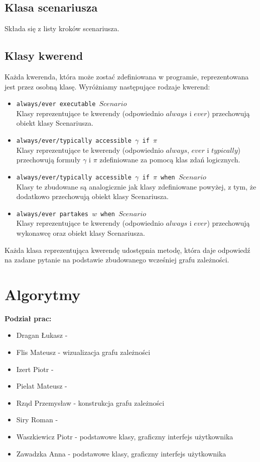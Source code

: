 \documentclass{article}
\begin{document}
\subsection{Klasa scenariusza}
Składa się z listy kroków scenariusza.

\subsection{Klasy kwerend}
Każda kwerenda, która może zostać zdefiniowana w programie, reprezentowana jest przez osobną klasę. Wyróżniamy następujące rodzaje kwerend:
\begin{itemize}
\item {\large\texttt{always/ever executable $Scenario$}} \\
Klasy reprezentujące te kwerendy (odpowiednio $always$ i $ever$) przechowują obiekt klasy Scenariusza.
\item {\large\texttt{always/ever/typically accessible $\gamma$ if $\pi$}}\\
Klasy reprezentujące te kwerendy (odpowiednio $always$, $ever$ i $typically$) przechowują formuły $\gamma$ i $\pi$ zdefiniowane za pomocą klas zdań logicznych.
\item {\large\texttt{always/ever/typically accessible $\gamma$ if $\pi$ when $Scenario$}}\\
Klasy te zbudowane są analogicznie jak klasy zdefiniowane powyżej, z tym, że dodatkowo przechowują obiekt klasy Scenariusza.
\item {\large\texttt{always/ever partakes $w$ when $Scenario$}}\\
Klasy reprezentujące te kwerendy (odpowiednio $always$ i $ever$) przechowują wykonawcę oraz obiekt klasy Scenariusza.
\end{itemize}
Każda klasa reprezentująca kwerendę udostępnia metodę, która daje odpowiedź na zadane pytanie na podstawie zbudowanego wcześniej grafu zależności.
\newpage

\section{Algorytmy}


\newpage
\textbf{Podział prac:}
\begin{itemize}
    \item Dragan Łukasz - 
    \item Flis Mateusz - wizualizacja grafu zależności
    \item Izert Piotr - 
    \item Pielat Mateusz - 
    \item Rząd Przemysław - konstrukcja grafu zależności
    \item Siry Roman - 
    \item Waszkiewicz Piotr - podstawowe klasy, graficzny interfejs użytkownika
    \item Zawadzka Anna - podstawowe klasy, graficzny interfejs użytkownika
\end{itemize}
\end{document}
